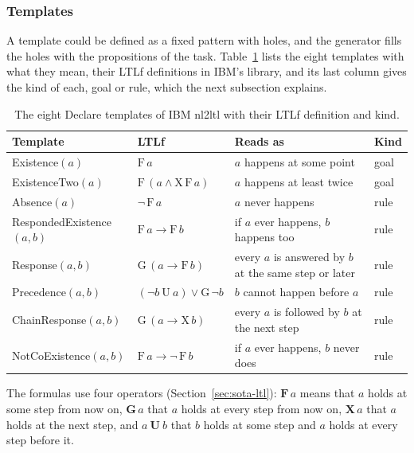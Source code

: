 \documentclass[11pt,english,listoffigures,listoftables]{tfgetsinf}
\begin{document}
\subsubsection{Templates}
\label{sec:templates}
A template could be defined as a fixed pattern with holes, and the generator fills the holes with the propositions of the task. Table~\ref{tab:templates} lists the eight templates with what they mean, their LTLf definitions in IBM's library, and its last column gives the kind of each, goal or rule, which the next subsection explains.

\begin{table}[H]
\centering
\footnotesize
\renewcommand{\arraystretch}{1.2}
\begin{tabular}{@{}ll>{\raggedright\arraybackslash}p{4.6cm}l@{}}
\toprule
\textbf{Template} & \textbf{LTLf} & \textbf{Reads as} & \textbf{Kind} \\ \midrule
Existence$(a)$ & $\mathrm{F}\,a$ & $a$ happens at some point & goal \\
ExistenceTwo$(a)$ & $\mathrm{F}\,(a \land \mathrm{X}\,\mathrm{F}\,a)$ & $a$ happens at least twice & goal \\
Absence$(a)$ & $\neg\,\mathrm{F}\,a$ & $a$ never happens & rule \\
RespondedExistence$(a,b)$ & $\mathrm{F}\,a \rightarrow \mathrm{F}\,b$ & if $a$ ever happens, $b$ happens too & rule \\
Response$(a,b)$ & $\mathrm{G}\,(a \rightarrow \mathrm{F}\,b)$ & every $a$ is answered by $b$ at the same step or later & rule \\
Precedence$(a,b)$ & $(\neg b\ \mathrm{U}\ a) \lor \mathrm{G}\,\neg b$ & $b$ cannot happen before $a$ & rule \\
ChainResponse$(a,b)$ & $\mathrm{G}\,(a \rightarrow \mathrm{X}\,b)$ & every $a$ is followed by $b$ at the next step & rule \\
NotCoExistence$(a,b)$ & $\mathrm{F}\,a \rightarrow \neg\,\mathrm{F}\,b$ & if $a$ ever happens, $b$ never does & rule \\ \bottomrule
\end{tabular}
\caption{The eight Declare templates of IBM nl2ltl with their LTLf definition and kind.}
\label{tab:templates}
\end{table}

The formulas use four operators (Section~\ref{sec:sota-ltl}): $\textbf{F}\,a$ means that $a$ holds at some step from now on, $\textbf{G}\,a$ that $a$ holds at every step from now on, $\textbf{X}\,a$ that $a$ holds at the next step, and $a\ \textbf{U}\ b$ that $b$ holds at some step and $a$ holds at every step before it.
\end{document}
